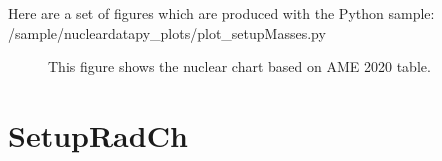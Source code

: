 \documentclass[letterpaper,10pt,english]{sphinxmanual}
\begin{document}
\sphinxAtStartPar
Here are a set of figures which are produced with the Python sample: /sample/nucleardatapy\_plots/plot\_setupMasses.py

\begin{figure}[htbp]
\centering
\capstart

\noindent{}
\caption{This figure shows the nuclear chart based on AME 2020 table.}\label{\detokenize{source/api/setup_masses:id1}}\end{figure}

\sphinxstepscope


\section{SetupRadCh}
\label{\detokenize{source/api/setup_rad_ch:setupradch}}\label{\detokenize{source/api/setup_rad_ch::doc}}\label{\detokenize{source/api/setup_rad_ch:module-nucleardatapy.setup_rad_ch}}
\end{document}

